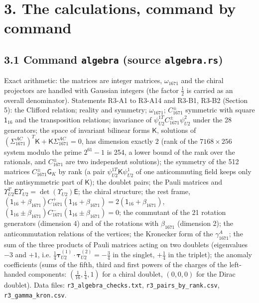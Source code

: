 \documentclass[
  10pt,
]{article}
\begin{document}
\hypertarget{the-calculations-command-by-command}{%
\section{3. The calculations, command by
command}\label{the-calculations-command-by-command}}

\hypertarget{command-algebra-source-algebra.rs}{%
\subsection{\texorpdfstring{3.1 Command \texttt{algebra} (source
\texttt{algebra.rs})}{3.1 Command algebra (source algebra.rs)}}\label{command-algebra-source-algebra.rs}}

Exact arithmetic: the matrices are integer matrices, \(\omega_{1671}\)
and the chiral projectors are handled with Gaussian integers (the factor
\(\tfrac12\) is carried as an overall denominator). Statements R3-A1 to
R3-A14 and R3-B1, R3-B2 (Section 5): the Clifford relation; reality and
symmetry; \(\omega_{1671}\); \(C^\pm_{1671}\) symmetric with square
\(\mathsf 1_{16}\) and the transposition relations; invariance of
\(\psi^{1T}_{U2}C^\pm_{1671}\psi^2_{U2}\) under the 28 generators; the
space of invariant bilinear forms \(\mathsf K\), solutions of
\((\Sigma^{AC}_{1671})^T\mathsf K+\mathsf K\Sigma^{AC}_{1671}=0\), has
dimension exactly 2 (rank of the \(7168\times256\) system modulo the
prime \(2^{61}-1\) is 254, a lower bound of the rank over the rationals,
and \(C^\pm_{1671}\) are two independent solutions); the symmetry of the
512 matrices \(C^\pm_{1671}\mathsf G_K\) by rank (a pair
\(\psi^{1T}_{U2}\mathsf K\psi^1_{U2}\) of one anticommuting field keeps
only the antisymmetric part of \(\mathsf K\)); the doublet pairs; the
Pauli matrices and
\(\Upsilon^T_{U2}\mathsf E\Upsilon_{U2}=\det(\Upsilon_{U2})\mathsf E\);
the chiral structure; the rest frame,
\((\mathsf 1_{16}+\beta_{1671})C^+_{1671}(\mathsf 1_{16}+\beta_{1671})=2(\mathsf 1_{16}+\beta_{1671})\),
\((\mathsf 1_{16}\pm\beta_{1671})C^-_{1671}(\mathsf 1_{16}\pm\beta_{1671})=0\);
the commutant of the 21 rotation generators (dimension 4) and of the
rotations with \(\beta_{1671}\) (dimension 2); the anticommutation
relations of the vertices; the Kronecker form of the
\(\gamma^A_{1671}\); the sum of the three products of Pauli matrices
acting on two doublets (eigenvalues \(-3\) and \(+1\), i.e.
\(\tfrac14\boldsymbol\tau^{(1)}_{U2}\cdot\boldsymbol\tau^{(2)}_{U2}=-\tfrac34\)
in the singlet, \(+\tfrac14\) in the triplet); the anomaly coefficients
(sums of the fifth, third and first powers of the charges of the
left-handed components: \((\tfrac1{16},\tfrac14,1)\) for a chiral
doublet, \((0,0,0)\) for the Dirac doublet). Data files:
\texttt{r3\_algebra\_checks.txt}, \texttt{r3\_pairs\_by\_rank.csv},
\texttt{r3\_gamma\_kron.csv}.
\end{document}
